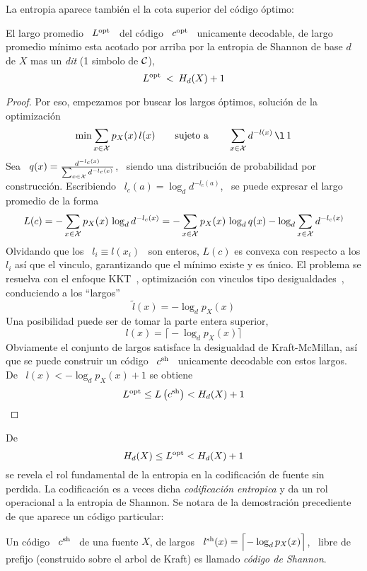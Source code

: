 La entropia aparece tambi\'en el la cota superior del c\'odigo \'optimo:
%
\begin{teorema}
  El largo promedio \ $L^{\mathrm{opt}}$ \ del c\'odigo \ $c^{\mathrm{opt}}$ \ unicamente decodable,
  de largo promedio m\'inimo esta acotado  por arriba por la entropia de Shannon
  de base $d$ de $X$ mas un {\it dit} (1 simbolo de $\mathcal{C}$), 
  \[
  L^{\mathrm{opt}} \: < \: H_d(X) + 1
  \]
\end{teorema}
%
\begin{proof}
  Por  eso,  empezamos  por  buscar  los  largos  \'optimos,  soluci\'on  de  la
  optimizaci\'on
  \[
  \min \sum_{x \in \X} p_X(x) \,  l(x) \qquad \mbox{sujeto a} \qquad \sum_{x \in
    \X} d^{-l(x)} \, \l \, 1
  \]
  Sea \ $q(x)  = \frac{d^{-l_c(x)}}{\sum_{x \in \mathcal{X}} d^{-l_c(x)}}$,  \ siendo una
  distribuci\'on de  probabilidad por  construcci\'on.  Escribiendo \  $l_c(a) =
  \log_d d^{-l_c(a)}$, \ se puede expresar el largo promedio de la forma
  \[
  L(c) =  - \sum_{x  \in \mathcal{X}}  p_X(x) \, \log_d  d^{-l_c(x)} =  - \sum_{x  \in \mathcal{X}}
  p_X(x) \, \log_d q(x) - \log_d \sum_{x \in \mathcal{X}} d^{-l_c(x)}
  \]
  Olvidando que  los \ $l_i \equiv l(x_i)$  \ son enteros, $L(c)$  es convexa con
  respecto a los $l_i$ as\'i que el vinculo, garantizando que el m\'inimo existe
  y    es    \'unico.    El    problema    se    resuelva    con   el    enfoque
  KKT~,      optimizaci\'on      con     vinculos      tipo
  desigualdades~\cite{Mil00, CamMar09}, conduciendo a los ``largos''
  \[
  \widetilde{l}(x) = - \log_d p_X(x)
  \]
  Una posibilidad puede ser de tomar la parte entera superior,
  \[
  l(x) = \Big\lceil\! - \log_d p_X(x) \Big\rceil
  \]
  Obviamente el  conjunto de largos satisface la  desigualdad de Kraft-McMillan,
  as\'i que se puede construir un  c\'odigo \ $c^{\mathrm{sh}}$ \ unicamente decodable con
  estos largos. De \ $l(x) < - \log_d p_X(x) + 1$ se obtiene
  \[
   L^{\mathrm{opt}} \le L\left( c^{\mathrm{sh}} \right) < H_d(X) + 1
  \]
\end{proof}
%
De  $$H_d(X) \le  L^{\mathrm{opt}} <  H_d(X) +  1$$  se revela  el rol  fundamental de  la
entropia en  la codificaci\'on  de fuente sin  perdida.  La codificaci\'on  es a
veces dicha {\it codificaci\'on entropica} y da un rol operacional a la entropia
de  Shannon. Se  notara  de la  demostraci\'on  precediente de  que aparece  un
c\'odigo particular:
%
\begin{definicion}
  Un c\'odigo \ $c^{\mathrm{sh}}$ \ de una  fuente $X$, de largos \ $l^{\mathrm{sh}}(x) = \Big\lceil\!
  - \log_d p_X(x) \Big\rceil$, \ libre  de prefijo (construido sobre el arbol de
  Kraft) es llamado {\it c\'odigo de Shannon}.
\end{definicion}
